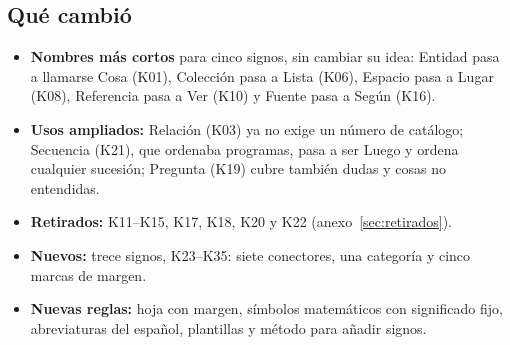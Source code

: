 \subsection{Qué cambió}
\begin{itemize}
\item \textbf{Nombres más cortos} para cinco signos, sin cambiar su idea:
 Entidad pasa a llamarse Cosa (K01), Colección pasa a Lista (K06), Espacio
 pasa a Lugar (K08), Referencia pasa a Ver (K10) y Fuente pasa a Según (K16).
\item \textbf{Usos ampliados:} Relación (K03) ya no exige un número de
 catálogo; Secuencia (K21), que ordenaba programas, pasa a ser Luego y ordena
 cualquier sucesión; Pregunta (K19) cubre también dudas y cosas no entendidas.
\item \textbf{Retirados:} K11--K15, K17, K18, K20 y K22 (anexo~\ref{sec:retirados}).
\item \textbf{Nuevos:} trece signos, K23--K35: siete conectores, una categoría
 y cinco marcas de margen.
\item \textbf{Nuevas reglas:} hoja con margen, símbolos matemáticos con
 significado fijo, abreviaturas del español, plantillas y método para añadir
 signos.
\end{itemize}

